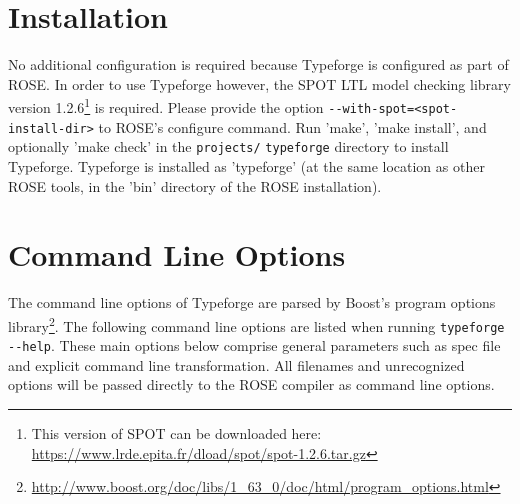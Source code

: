 \documentclass[natbib]{article}
\begin{document}
\section{Installation}

No additional configuration is required because Typeforge is configured as part of ROSE. 
In order to use Typeforge however, the SPOT LTL model checking library version 
1.2.6\footnote{This version of SPOT can be downloaded here: 
\url{https://www.lrde.epita.fr/dload/spot/spot-1.2.6.tar.gz}} is required. Please provide the option
\verb+--with-spot=<spot-install-dir>+ to ROSE's configure command.
Run 'make', 'make install', and optionally 'make check' in the
\verb+projects/+ \verb+typeforge+ directory to install Typeforge. Typeforge is
installed as 'typeforge' (at the same location as other ROSE tools, in
the 'bin' directory of the ROSE installation).

\section{Command Line Options}
The command line options of Typeforge are parsed by Boost's program options 
library\footnote{\url{http://www.boost.org/doc/libs/1_63_0/doc/html/program_options.html}}.
The following command line options are listed when running \verb+typeforge --help+.
These main options below comprise general parameters such as spec file and explicit command line 
transformation. All filenames and unrecognized options will be passed directly to the ROSE compiler 
as command line options.
\end{document}
